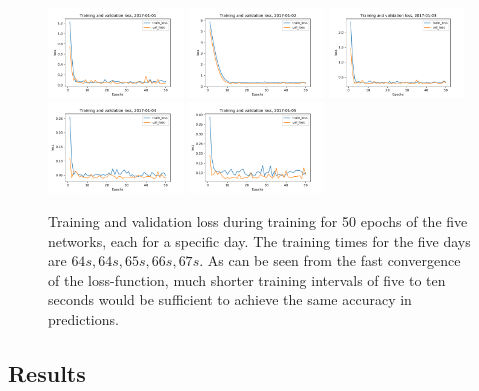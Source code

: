 \documentclass[
a4paper,     %
12pt           %
]{scrartcl}  %
\numberwithin{equation}{section}
\begin{document}
\begin{figure}
	\centering
	\includegraphics[width=0.32\textwidth]{fig/loss2017-01-01_rec_3lay_seed1.pdf}
	\includegraphics[width=0.32\textwidth]{fig/loss2017-01-02_rec_3lay_seed1.pdf}
	\includegraphics[width=0.32\textwidth]{fig/loss2017-01-03_rec_3lay_seed1.pdf}
	\includegraphics[width=0.32\textwidth]{fig/loss2017-01-04_rec_3lay_seed1.pdf}
	\includegraphics[width=0.32\textwidth]{fig/loss2017-01-05_rec_3lay_seed1.pdf}
	\caption{Training and validation loss during training for 50 epochs of the five networks, each for a specific day. The training times for the five days are $64s, 64s, 65s, 66s, 67s$. As can be seen from the fast convergence of the loss-function, much shorter training intervals of five to ten seconds would be sufficient to achieve the same accuracy in predictions.}
	\label{fig:loss}
\end{figure}

\subsection{Results}
\end{document}
